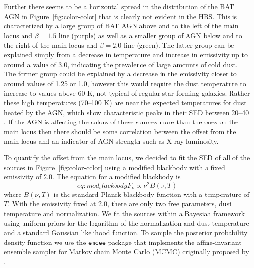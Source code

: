 Further there seems to be a horizontal spread in the distribution of the BAT AGN in Figure~\ref{fig:color-color} that is clearly not evident in the HRS. This is characterized by a large group of BAT AGN above and to the left of the main locus and $\beta=1.5$ line (purple) as well as a smaller group of AGN below and to the right of the main locus and $\beta=2.0$ line (green). The latter group can be explained simply from a decrease in temperature and increase in emissivity up to around a value of 3.0, indicating the prevalence of large amounts of cold dust. The former group could be explained by a decrease in the emissivity closer to around values of 1.25 or 1.0, however this would require the dust temperature to increase to values above 60 K, not typical of regular star-forming galaxies. Rather these high temperatures (70--100 K) are near the expected temperatures for dust heated by the AGN, which show characteristic peaks in their SED between 20--40 \um{} \citep{Richards:2006fj, Netzer:2007ve, Mullaney:2011yq}. If the AGN is affecting the colors of these sources more than the ones on the main locus then there should be some correlation between the offset from the main locus and an indicator of AGN strength such as X-ray luminosity. 

To quantify the offset from the main locus, we decided to fit the SED of all of the sources in Figure~\ref{fig:color-color} using a modified blackbody with a fixed emissivity of 2.0. The equation for a modified blackbody is
\begin{equation}{eq:mod_blackbody}
F_{\nu} \propto \nu^{2}B(\nu, T)
\end{equation}
\noindent where $B(\nu, T)$ is the standard Planck blackbody function with a temperature of $T$. With the emissivity fixed at 2.0, there are only two free parameters, dust temperature and normalization. We fit the sources within a Bayesian framework using uniform priors for the logarithm of the normalization and dust temperature and a standard Gaussian likelihood function. To sample the posterior probability density function we use the \texttt{emcee} package \citep{Foreman-Mackey:2013lr} that implements the affine-invariant ensemble sampler for Markov chain Monte Carlo (MCMC) originally proposed by \citet{Goodman_2010}. 



  